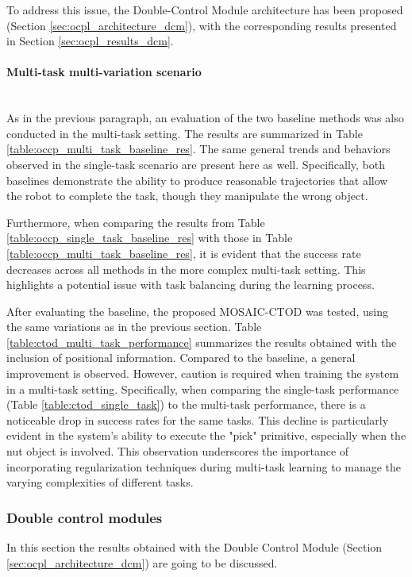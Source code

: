 To address this issue, the Double-Control Module architecture has been proposed (Section \ref{sec:ocpl_architecture_dcm}), with the corresponding results presented in Section \ref{sec:ocpl_results_dcm}.

\paragraph*{Multi-task multi-variation scenario}\mbox{}\\
As in the previous paragraph, an evaluation of the two baseline methods was also conducted in the multi-task setting. The results are summarized in Table \ref{table:occp_multi_task_baseline_res}. The same general trends and behaviors observed in the single-task scenario are present here as well. Specifically, both baselines demonstrate the ability to produce reasonable trajectories that allow the robot to complete the task, though they manipulate the wrong object.

Furthermore, when comparing the results from Table \ref{table:occp_single_task_baseline_res} with those in Table \ref{table:occp_multi_task_baseline_res}, it is evident that the success rate decreases across all methods in the more complex multi-task setting. This highlights a potential issue with task balancing during the learning process.


After evaluating the baseline, the proposed MOSAIC-CTOD was tested, using the same variations as in the previous section. Table \ref{table:ctod_multi_task_performance} summarizes the results obtained with the inclusion of positional information. Compared to the baseline, a general improvement is observed. However, caution is required when training the system in a multi-task setting. Specifically, when comparing the single-task performance (Table \ref{table:ctod_single_task}) to the multi-task performance, there is a noticeable drop in success rates for the same tasks. This decline is particularly evident in the system's ability to execute the "pick" primitive, especially when the nut object is involved. This observation underscores the importance of incorporating regularization techniques during multi-task learning to manage the varying complexities of different tasks.


\subsubsection{Double control modules}
In this section the results obtained with the Double Control Module (Section \ref{sec:ocpl_architecture_dcm}) are going to be discussed.
\label{sec:ocpl_results_dcm}
